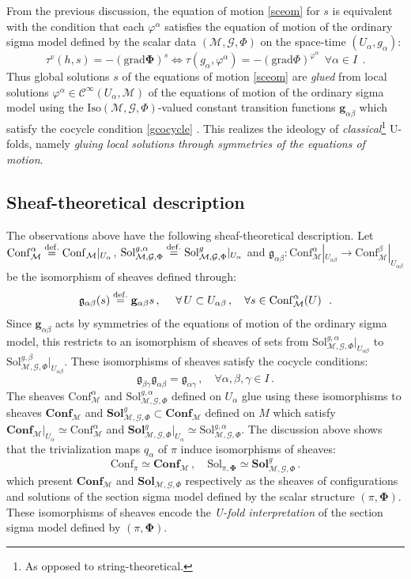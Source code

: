 \documentclass[10pt, cmp, numbook, final, a4paper]{svjour}
\newcommand*{\SavedEqref}{}
\let\SavedEqref\eqref
\renewcommand*{\eqref}[1]{%
  \begingroup
    \hypersetup{
      linkcolor=blue,
      linkbordercolor=blue,
    }%
    \SavedEqref{#1}%
  \endgroup
}
\newcommand{\eqdef}{\stackrel{{\rm def.}}{=}}
\newcommand{\be}{\begin{equation*}}
\newcommand{\ee}{\end{equation*}}
\newcommand{\ben}{\begin{equation}}
\newcommand{\een}{\end{equation}}
\def\cC{{\mathcal C}}
\newcommand{\cM}{\mathcal{M}}
\def\cG{\mathcal{G}}
\def\cC{\mathcal{C}}
\def\bg{\mathbf{g}}
\def\bPhi{\mathbf{\Phi}}
\def\bConf{\mathbf{Conf}}
\def\bSol{\mathbf{Sol}}
\def\grad{\mathrm{grad}}
\def\bg{\mathbf{g}}
\def\Iso{\mathrm{Iso}}
\def\Sol{\mathrm{Sol}}
\def\Conf{\mathrm{Conf}}
\def\fg{\mathfrak{g}}
\begin{document}
From the previous discussion, the equation of motion \eqref{sceom} for
$s$ is equivalent with the condition that each $\varphi^{\alpha}$
satisfies the equation of motion of the ordinary sigma model defined
by the scalar data $(\cM,\cG,\Phi)$ on the space-time
$(U_\alpha,g_\alpha)$:
\ben
\label{localeomscalar}
\tau^v(h, s)=-(\grad \bPhi)^s \Leftrightarrow \tau(g_\alpha, \varphi^{\alpha})=-(\grad\Phi)^{\varphi^{\alpha}} ~~\forall \alpha\in I~~.
\een
Thus global solutions $s$ of the equations of motion \eqref{sceom} are
\emph{glued} from local solutions $\varphi^{\alpha}\in
\cC^\infty(U_\alpha,\cM)$ of the equations of motion of the ordinary
sigma model using the $\Iso(\cM,\cG,\Phi)$-valued constant transition
functions $\bg_{\alpha\beta}$ which satisfy the cocycle condition
\eqref{gcocycle}. This realizes the ideology of {\em
  classical}\footnote{As opposed to string-theoretical.} U-folds,
namely \emph{gluing local solutions through symmetries of the
  equations of motion}.


\subsection{Sheaf-theoretical description} 
	
The observations above have the following sheaf-theoretical
description. Let $\Conf_\cM^{\alpha}\eqdef \Conf_\cM|_{U_\alpha}$,
$\Sol^{g,{\alpha}}_{\cM,\cG,\Phi}\eqdef
\Sol^g_{\cM,\cG,\Phi}|_{U_\alpha}$ and
$\fg_{\alpha\beta}:\Conf_\cM^{\alpha}|_{U_{\alpha\beta}}\rightarrow\Conf_\cM^{\beta}|_{U_{\alpha\beta}}$
be the isomorphism of sheaves defined through:
\be
\fg_{\alpha\beta}(s) \eqdef \bg_{\alpha\beta} s\, ,\quad  \,\, \forall\, U\subset U_{\alpha\beta}\, , \quad \forall s\in \Conf_\cM^{\alpha}(U)~~.
\ee
Since $\bg_{\alpha\beta}$ acts by symmetries of the equations of
motion of the ordinary sigma model, this restricts to an isomorphism
of sheaves of sets from
$\Sol^{g,{\alpha}}_{\cM,\cG,\Phi}|_{U_{\alpha\beta}}$ to
$\Sol^{g,\beta}_{\cM,\cG,\Phi}|_{U_{\alpha\beta}}$. These isomorphisms
of sheaves satisfy the cocycle conditions:
\be
\fg_{\beta\gamma}\fg_{\alpha\beta}=\fg_{\alpha\gamma}\, , \quad\forall \alpha,\beta,\gamma\in I\, . 
\ee
The sheaves $\Conf_\cM^{\alpha}$ and $\Sol_{\cM,\cG,\Phi}^{g,\alpha}$
defined on $U_\alpha$ glue using these isomorphisms to sheaves
$\bConf_\cM$ and $\bSol^{g}_{\cM,\cG,\Phi}\subset \bConf_\cM$ defined
on $M$ which satisfy $\bConf_\cM|_{U_\alpha}\simeq \Conf_\cM^{\alpha}$
and
$\bSol_{\cM,\cG,\Phi}^{g}|_{U_\alpha}\simeq \Sol_{\cM,\cG,\Phi}^{g,\alpha}$. The
discussion above shows that the trivialization maps $q_\alpha$ of
$\pi$ induce isomorphisms of sheaves:
\be
\Conf_\pi\simeq \bConf_\cM\, , \quad \Sol_{\pi,\bPhi}\simeq \bSol_{\cM,\cG,\Phi}^{g}\, .
\ee
which present $\bConf_\cM$ and $\bSol_{\cM,\cG,\Phi}$ respectively as
the sheaves of configurations and solutions of the section sigma model
defined by the scalar structure $(\pi,\bPhi)$. These isomorphisms of
sheaves encode the {\em U-fold interpretation} of the section sigma
model defined by $(\pi,\bPhi)$.
\end{document}
